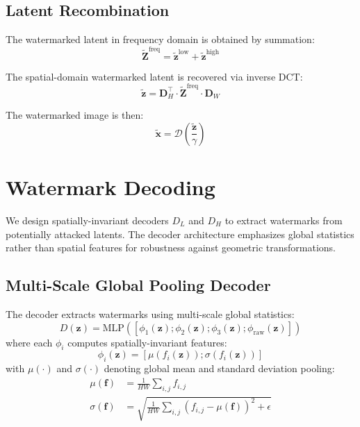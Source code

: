 \documentclass[11pt]{article}
\begin{document}
\subsection{Latent Recombination}

The watermarked latent in frequency domain is obtained by summation:
\begin{equation}
    \tilde{\mathbf{Z}}^{\text{freq}} = \tilde{\mathbf{z}}^{\text{low}} + \tilde{\mathbf{z}}^{\text{high}}
\end{equation}

The spatial-domain watermarked latent is recovered via inverse DCT:
\begin{equation}
    \tilde{\mathbf{z}} = \mathbf{D}_H^{\top} \cdot \tilde{\mathbf{Z}}^{\text{freq}} \cdot \mathbf{D}_W
\end{equation}

The watermarked image is then:
\begin{equation}
    \tilde{\mathbf{x}} = \mathcal{D}\left(\frac{\tilde{\mathbf{z}}}{\gamma}\right)
\end{equation}

\section{Watermark Decoding}

We design spatially-invariant decoders $D_L$ and $D_H$ to extract watermarks from potentially attacked latents. The decoder architecture emphasizes global statistics rather than spatial features for robustness against geometric transformations.

\subsection{Multi-Scale Global Pooling Decoder}

The decoder extracts watermarks using multi-scale global statistics:
\begin{equation}
    D(\mathbf{z}) = \text{MLP}\left(\left[\phi_1(\mathbf{z}); \phi_2(\mathbf{z}); \phi_3(\mathbf{z}); \phi_{\text{raw}}(\mathbf{z})\right]\right)
\end{equation}
where each $\phi_i$ computes spatially-invariant features:
\begin{equation}
    \phi_i(\mathbf{z}) = \left[\mu(f_i(\mathbf{z})); \sigma(f_i(\mathbf{z}))\right]
\end{equation}
with $\mu(\cdot)$ and $\sigma(\cdot)$ denoting global mean and standard deviation pooling:
\begin{align}
    \mu(\mathbf{f}) &= \frac{1}{HW}\sum_{i,j} f_{i,j} \\
    \sigma(\mathbf{f}) &= \sqrt{\frac{1}{HW}\sum_{i,j}(f_{i,j} - \mu(\mathbf{f}))^2 + \epsilon}
\end{align}
\end{document}
